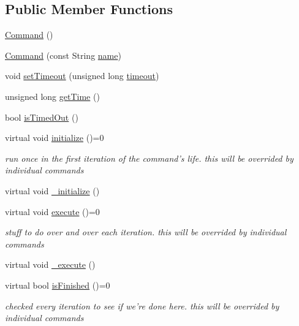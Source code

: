 \subsection*{Public Member Functions}
\begin{DoxyCompactItemize}
\item 
\hyperlink{classCommand_a18df2d81039392daeb0b78c346a70537}{Command} ()
\item 
\hyperlink{classCommand_a5f939f31974c4955c486b18a07675698}{Command} (const String \hyperlink{classCommand_a19f7ad73ca8599ad47f9b7bcccc52610}{name})
\item 
void \hyperlink{classCommand_adfbbaa47b15c80c2a713d24e48b843a8}{set\-Timeout} (unsigned long \hyperlink{classCommand_a687b30a3d41c93f91dfba5a88c98f270}{timeout})
\item 
unsigned long \hyperlink{classCommand_a53de8c6445ccd2f51fe7535a71e20c98}{get\-Time} ()
\item 
bool \hyperlink{classCommand_ac62a4b3acc8db6c5e396d5c97ca51a98}{is\-Timed\-Out} ()
\item 
virtual void \hyperlink{classCommand_af186abe582ab15ac64750e4b5d7944de}{initialize} ()=0
\begin{DoxyCompactList}\small\item\em run once in the first iteration of the command's life. this will be overrided by individual commands \end{DoxyCompactList}\item 
virtual void \hyperlink{classCommand_ae7c58ad4895c51ff18f1d432dbd4f4ec}{\-\_\-initialize} ()
\item 
virtual void \hyperlink{classCommand_a6fd7d9bd8df8bfc881e4d6c7cd1878b7}{execute} ()=0
\begin{DoxyCompactList}\small\item\em stuff to do over and over each iteration. this will be overrided by individual commands \end{DoxyCompactList}\item 
virtual void \hyperlink{classCommand_a49e6861e0c14411d6860f0b3211db9c9}{\-\_\-execute} ()
\item 
virtual bool \hyperlink{classCommand_a9aa704d5f9d98f510a79e645701dc72a}{is\-Finished} ()=0
\begin{DoxyCompactList}\small\item\em checked every iteration to see if we're done here. this will be overrided by individual commands \end{DoxyCompactList}\item 

\end{DoxyCompactItemize}
